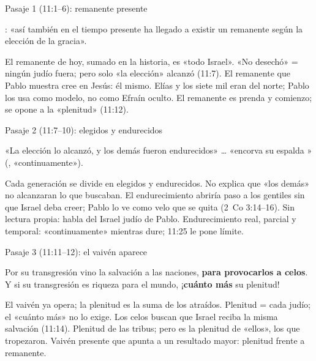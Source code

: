 \begin{frame}{Pasaje 1 (11:1--6): remanente presente}
\begin{cita}[fontupper=\scriptsize\itshape]: «así también en el tiempo presente ha llegado a existir un remanente según la elección de la gracia».\end{cita}
%
{El remanente de hoy, sumado en la historia, es «todo Israel».}%
{«No desechó» = ningún judío fuera; pero solo «la elección» alcanzó (11:7).}%
{El remanente que Pablo muestra cree en Jesús: él mismo.}%
{Elías y los siete mil eran del norte; Pablo los usa como modelo, no como Efraín oculto.}%
{El remanente es prenda y comienzo; se opone a la «plenitud» (11:12).}
\par\vspace{2pt}
\end{frame}

\begin{frame}{Pasaje 2 (11:7--10): elegidos y endurecidos}
\begin{cita}[fontupper=\scriptsize\itshape]«La elección lo alcanzó, y los demás fueron endurecidos» \ldots{} «encorva su espalda » (, «continuamente»).\end{cita}
%
{Cada generación se divide en elegidos y endurecidos.}%
{No explica que «los demás» no alcanzaran lo que buscaban.}%
{El endurecimiento abriría paso a los gentiles sin que Israel deba creer; Pablo lo ve como velo que se quita (2~Co 3:14--16).}%
{Sin lectura propia: habla del Israel judío de Pablo.}%
{Endurecimiento real, parcial y temporal: «continuamente» mientras dure; 11:25 le pone límite.}
\end{frame}

\begin{frame}{Pasaje 3 (11:11--12): el vaivén aparece}
\begin{cita}[fontupper=\scriptsize\itshape]Por su transgresión vino la salvación a las naciones, \textbf{para provocarlos a celos}. Y si su transgresión es riqueza para el mundo, ¡\textbf{cuánto más} su plenitud!\end{cita}
%
{El vaivén ya opera; la plenitud es la suma de los atraídos.}%
{Plenitud = cada judío; el «cuánto más» no lo exige.}%
{Los celos buscan que Israel reciba la misma salvación (11:14).}%
{Plenitud de las tribus; pero es la plenitud de «ellos», los que tropezaron.}%
{Vaivén presente que apunta a un resultado mayor: plenitud frente a remanente.}
\par\vspace{2pt}
\end{frame}

